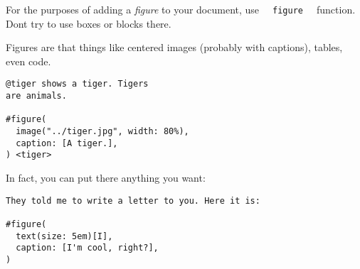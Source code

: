 For the purposes of adding a \emph{figure} to your document, use
\texttt{\ }{\texttt{\ figure\ }}\texttt{\ } function.
Don\textquotesingle t try to use boxes or blocks there.

Figures are that things like centered images (probably with captions),
tables, even code.

\begin{verbatim}
@tiger shows a tiger. Tigers
are animals.

#figure(
  image("../tiger.jpg", width: 80%),
  caption: [A tiger.],
) <tiger>
\end{verbatim}

\pandocbounded{}

In fact, you can put there anything you want:

\begin{verbatim}
They told me to write a letter to you. Here it is:

#figure(
  text(size: 5em)[I],
  caption: [I'm cool, right?],
) 
\end{verbatim}

\pandocbounded{}
